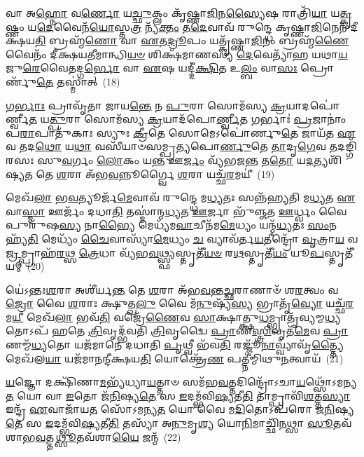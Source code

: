 𑌵𑌾 𑌅\-\ul{𑌹𑍍𑌨𑍋} 𑌵\-\ul{𑌰𑍍𑌣𑍋} 𑌯\-\ul{𑌚𑍍𑌛𑍁}\-𑌕𑍍𑌲𑌂 𑌕𑍃᳴𑌷𑍍𑌣𑌾\-\ul{𑌜𑌿}\-𑌨\-\ul{𑌸𑍍𑌯𑍈}\-𑌷 𑌰𑌾𑌤𑍍𑌰𑌿᳴\-\ul{𑌯𑌾} 𑌯\-\ul{𑌤𑍍𑌕𑍃}\-𑌷𑍍𑌣𑌂 𑌯\-\ul{𑌦𑍇}\-𑌵𑍈𑌨᳴\-\ul{𑌯𑍋}\-𑌸𑍍𑌤\-\ul{𑌤𑍍𑌰} 𑌨𑍍𑌯᳴\-\ul{𑌕𑍍𑌤𑌂} 𑌤\-\ul{𑌦𑍇}\-𑌵𑌾𑌵᳴ 𑌰𑍁𑌨𑍍𑌦𑍍𑌧𑍇 𑌕𑍃𑌷𑍍𑌣𑌾\-\ul{𑌜𑌿}\-𑌨𑍇𑌨᳴ 𑌦𑍀𑌕𑍍𑌷𑌯\-\ul{𑌤𑌿} 𑌬𑍍𑌰𑌹𑍍𑌮᳴\-\ul{𑌣𑍋} 𑌵𑌾 \ul{𑌏}\-𑌤\-\ul{𑌦𑍍𑌰𑍂}\-𑌪𑌂 𑌯𑌤𑍍𑌕𑍃᳴𑌷𑍍𑌣𑌾\-\ul{𑌜𑌿}\-𑌨𑌂 𑌬𑍍𑌰𑌹𑍍𑌮᳴\-\ul{𑌣𑍈}\-𑌵𑍈𑌨𑌂᳴ 𑌦𑍀𑌕𑍍𑌷𑌯\-\ul{𑌤𑍀}\-𑌮𑌾𑌨𑍍𑌧𑌿\-\ul{𑌯}\-\-\ul{𑍞} 𑌶𑌿𑌕𑍍𑌷᳴𑌮𑌾𑌣𑌸𑍍𑌯 \ul{𑌦𑍇}\-𑌵𑍇𑌤𑍍𑌯𑌾᳴𑌹 𑌯𑌥𑌾\-\ul{𑌯}\-𑌜𑍁\-\ul{𑌰𑍇}\-𑌵𑍈𑌤𑌦𑍍𑌗\-\ul{𑌰𑍍𑌭𑍋} 𑌵𑌾 \ul{𑌏}\-𑌷 𑌯𑌦𑍍𑌦𑍀॑\-\ul{𑌕𑍍𑌷𑌿}\-𑌤 𑌉\-\ul{𑌲𑍍𑌬𑌂} 𑌵𑌾\-\ul{𑌸𑌃} 𑌪𑍍𑌰𑍋𑌰𑍍𑌣𑍁᳴\-\ul{𑌤𑍇} 𑌤𑌸𑍍𑌮𑌾॑𑌤𑍍~(18)

𑌗\-\ul{𑌰𑍍𑌭𑌾𑌃} 𑌪𑍍𑌰𑌾𑌵𑍃᳴𑌤𑌾 𑌜𑌾𑌯\-\ul{𑌨𑍍𑌤𑍇} 𑌨 \ul{𑌪𑍁}\-𑌰𑌾 𑌸𑍋𑌮᳴𑌸𑍍𑌯 \ul{𑌕𑍍𑌰}\-𑌯𑌾𑌦𑌪𑍋॑𑌰𑍍𑌣𑍍𑌵𑍀\-\ul{𑌤} 𑌯\-\ul{𑌤𑍍𑌪𑍁}\-𑌰𑌾 𑌸𑍋𑌮᳴𑌸𑍍𑌯 \ul{𑌕𑍍𑌰}\-𑌯𑌾𑌦᳴𑌪𑍋\-\ul{𑌰𑍍𑌣𑍍𑌵𑍀}\-𑌤 𑌗𑌰𑍍𑌭𑌾𑌃॑ \ul{𑌪𑍍𑌰}\-𑌜𑌾𑌨𑌾𑌂॑ 𑌪\-\ul{𑌰𑌾}\-𑌪𑌾𑌤𑍁᳴𑌕𑌾𑌃 𑌸𑍍𑌯𑍁𑌃 \ul{𑌕𑍍𑌰𑍀}\-𑌤𑍇 𑌸𑍋𑌮𑍇\-𑌽𑌪𑍋॑𑌰𑍍𑌣𑍁\-\ul{𑌤𑍇} 𑌜𑌾𑌯᳴𑌤 \ul{𑌏}\-𑌵 𑌤𑌦\-\ul{𑌥𑍋} 𑌯\-\ul{𑌥𑌾} 𑌵𑌸𑍀᳴𑌯𑌾𑍞𑌸𑌮𑍍𑌪𑍍𑌰𑌤𑍍𑌯𑌪𑍋\-\ul{𑌰𑍍𑌣𑍁}\-𑌤𑍇 \ul{𑌤𑌾}\-𑌦𑍃\-\ul{𑌗𑍇}\-𑌵 𑌤𑌦𑌙𑍍𑌗𑌿᳴𑌰𑌸𑌃 𑌸𑍁\-\ul{𑌵}\-𑌰𑍍𑌗𑌂 \ul{𑌲𑍋}\-𑌕𑌂 𑌯\-\ul{𑌨𑍍𑌤} 𑌊\-\ul{𑌰𑍍𑌜𑌂} 𑌵𑍍𑌯᳴𑌭𑌜\-\ul{𑌨𑍍𑌤} 𑌤\-\ul{𑌤𑍋} 𑌯\-\ul{𑌦}\-𑌤𑍍𑌯𑌶𑌿᳴𑌷𑍍𑌯\-\ul{𑌤} 𑌤𑍇 \ul{𑌶}\-𑌰𑌾 𑌅᳴𑌭\-\ul{𑌵}\-𑌨𑍍𑌨𑍂𑌰𑍍𑌗𑍍𑌵𑍈 \ul{𑌶}\-𑌰𑌾 𑌯𑌚𑍍𑌛᳴\-\ul{𑌰}\-𑌮𑌯𑍀॑~(19)

𑌮𑍇𑌖᳴\-\ul{𑌲𑌾} 𑌭\-\ul{𑌵}\-𑌤𑍍𑌯𑍂𑌰𑍍𑌜᳴\-\ul{𑌮𑍇}\-𑌵𑌾𑌵᳴ 𑌰𑍁𑌨𑍍𑌦𑍍𑌧𑍇 𑌮\-\ul{𑌧𑍍𑌯}\-𑌤𑌃 𑌸𑌨𑍍𑌨᳴𑌹𑍍𑌯𑌤𑌿 𑌮\-\ul{𑌧𑍍𑌯}\-𑌤 \ul{𑌏}\-𑌵𑌾\-\ul{𑌸𑍍𑌮𑌾} 𑌊𑌰𑍍𑌜𑌂᳴ 𑌦𑌧𑌾\-\ul{𑌤𑌿} 𑌤𑌸𑍍𑌮𑌾॑𑌨𑍍𑌮\-\ul{𑌧𑍍𑌯}\-𑌤 \ul{𑌊}\-𑌰𑍍𑌜𑌾 𑌭𑍁᳴𑌞𑍍𑌜𑌤 \ul{𑌊}\-𑌰𑍍𑌧𑍍𑌵𑌂 𑌵𑍈 𑌪𑍁𑌰𑍁᳴𑌷\-\ul{𑌸𑍍𑌯} 𑌨𑌾\-\ul{𑌭𑍍𑌯𑍈} 𑌮𑍇𑌧𑍍𑌯᳴𑌮\-\ul{𑌵𑌾}\-𑌚𑍀𑌨᳴𑌮\-\ul{𑌮𑍇}\-𑌧𑍍𑌯𑌂 𑌯𑌨𑍍𑌮᳴\-\ul{𑌧𑍍𑌯}\-𑌤𑌃 \ul{𑌸𑌂}\-𑌨𑌹𑍍𑌯᳴\-\ul{𑌤𑌿} 𑌮𑍇𑌧𑍍𑌯𑌂᳴ \ul{𑌚𑍈}\-𑌵𑌾𑌸𑍍𑌯𑌾᳴\-\ul{𑌮𑍇}\-𑌧𑍍𑌯𑌂 \ul{𑌚} 𑌵𑍍𑌯𑌾𑌵᳴𑌰𑍍𑌤\-\ul{𑌯}\-𑌤𑍀𑌨𑍍𑌦𑍍𑌰𑍋᳴ \ul{𑌵𑍃}\-𑌤𑍍𑌰𑌾\-\ul{𑌯} 𑌵\-\ul{𑌜𑍍𑌰}\-𑌮𑍍𑌪𑍍𑌰𑌾𑌹᳴\-\ul{𑌰}\-𑌥𑍍𑌸 \ul{𑌤𑍍𑌰𑍇}\-𑌧𑌾 𑌵𑍍𑌯᳴𑌭\-\ul{𑌵}\-𑌥𑍍𑌸𑍍𑌫𑍍𑌯𑌸𑍍𑌤𑍃𑌤𑍀᳴\-\ul{𑌯}\-\-\ul{𑍞} 𑌰\-\ul{𑌥}\-𑌸𑍍𑌤𑍃𑌤𑍀᳴\-\ul{𑌯𑌂} 𑌯𑍂\-\ul{𑌪}\-𑌸𑍍𑌤𑍃𑌤𑍀᳴𑌯𑌮𑍍~(20)

𑌯𑍇॑\-𑌽𑌨𑍍𑌤𑌃\-\ul{𑌶}\-𑌰𑌾 𑌅𑌶𑍀॑𑌰𑍍𑌯\-\ul{𑌨𑍍𑌤} 𑌤𑍇 \ul{𑌶}\-𑌰𑌾 𑌅᳴𑌭\-\ul{𑌵}\-𑌨𑍍𑌤\-\ul{𑌚𑍍𑌛}\-𑌰𑌾𑌣𑌾𑍞᳴ 𑌶\-\ul{𑌰}\-𑌤𑍍𑌵𑌂 𑌵\-\ul{𑌜𑍍𑌰𑍋} 𑌵𑍈 \ul{𑌶}\-𑌰𑌾𑌃 𑌕𑍍𑌷𑍁𑌤𑍍𑌖\-\ul{𑌲𑍁} 𑌵𑍈 𑌮᳴\-\ul{𑌨𑍁}\-𑌷𑍍𑌯᳴\-\ul{𑌸𑍍𑌯} 𑌭𑍍𑌰𑌾𑌤𑍃᳴\-\ul{𑌵𑍍𑌯𑍋} 𑌯𑌚𑍍𑌛᳴\-\ul{𑌰}\-𑌮\-\ul{𑌯𑍀} 𑌮𑍇𑌖᳴\-\ul{𑌲𑌾} 𑌭𑌵᳴\-\ul{𑌤𑌿} 𑌵𑌜𑍍𑌰𑍇᳴\-\ul{𑌣𑍈}\-𑌵 \ul{𑌸𑌾}\-𑌕𑍍𑌷𑌾𑌤𑍍𑌕𑍍𑌷𑍁\-\ul{𑌧}\-𑌮𑍍𑌭𑍍𑌰𑌾𑌤𑍃᳴𑌵𑍍𑌯𑌮𑍍𑌮\-\ul{𑌧𑍍𑌯}\-𑌤𑍋\-𑌽𑌪᳴ 𑌹𑌤𑍇 \ul{𑌤𑍍𑌰𑌿}\-𑌵𑍃𑌦𑍍𑌭᳴𑌵𑌤𑌿 \ul{𑌤𑍍𑌰𑌿}\-𑌵𑍃𑌦𑍍𑌵𑍈 \ul{𑌪𑍍𑌰𑌾}\-𑌣\-\ul{𑌸𑍍𑌤𑍍𑌰𑌿}\-𑌵𑍃𑌤᳴\-\ul{𑌮𑍇}\-𑌵 \ul{𑌪𑍍𑌰𑌾}\-𑌣𑌮𑍍𑌮᳴\-\ul{𑌧𑍍𑌯}\-𑌤𑍋 𑌯𑌜᳴𑌮𑌾𑌨𑍇 𑌦𑌧𑌾𑌤𑌿 \ul{𑌪𑍃}\-𑌥𑍍𑌵𑍀 𑌭᳴𑌵\-\ul{𑌤𑌿} 𑌰𑌜𑍍𑌜𑍂᳴\-\ul{𑌨𑌾}\-𑌵𑍍𑌵𑍍𑌯𑌾𑌁𑌵𑍃᳴\-\ul{𑌤𑍍𑌤𑍍𑌯𑍈} 𑌮𑍇𑌖᳴𑌲\-\ul{𑌯𑌾} 𑌯𑌜᳴𑌮𑌾𑌨𑌨𑍍𑌦𑍀𑌕𑍍𑌷𑌯\-\ul{𑌤𑌿} 𑌯𑍋𑌕𑍍𑌤𑍍𑌰𑍇᳴\-\ul{𑌣} 𑌪𑌤𑍍𑌨𑍀॑𑌮𑍍𑌮𑌿𑌥𑍁\-\ul{𑌨}\-𑌤𑍍𑌵𑌾𑌯᳴~(21)

\-\ul{𑌯}\-𑌜𑍍𑌞𑍋 𑌦𑌕𑍍𑌷𑌿᳴𑌣𑌾\-\ul{𑌮}\-𑌭𑍍𑌯᳴𑌧𑍍𑌯𑌾\-\ul{𑌯}\-𑌤𑍍𑌤𑌾𑍞 𑌸𑌮᳴𑌭\-\ul{𑌵}\-𑌤𑍍𑌤𑌦𑌿𑌨𑍍𑌦𑍍𑌰𑍋᳴\-𑌽𑌚𑌾\-\ul{𑌯}\-𑌥𑍍𑌸𑍋᳴\-𑌽𑌮𑌨𑍍𑌯\-\ul{𑌤} 𑌯𑍋 𑌵𑌾 \ul{𑌇}\-𑌤𑍋 𑌜᳴\-\ul{𑌨𑌿}\-𑌷𑍍𑌯\-\ul{𑌤𑍇} 𑌸 \ul{𑌇}\-𑌦𑌮𑍍𑌭᳴𑌵𑌿\-\ul{𑌷𑍍𑌯}\-𑌤𑍀\-\ul{𑌤𑌿} 𑌤𑌾𑌮𑍍𑌪𑍍𑌰𑌾𑌵𑌿᳴\-\ul{𑌶}\-𑌤𑍍𑌤\-\ul{𑌸𑍍𑌯𑌾} 𑌇𑌨𑍍𑌦𑍍𑌰᳴ \ul{𑌏}\-𑌵𑌾𑌜𑌾᳴𑌯\-\ul{𑌤} 𑌸𑍋᳴\-𑌽𑌮𑌨𑍍𑌯\-\ul{𑌤} 𑌯𑍋 𑌵𑍈 𑌮\-\ul{𑌦𑌿}\-𑌤𑍋\-𑌽𑌪᳴𑌰𑍋 𑌜\-\ul{𑌨𑌿}\-𑌷𑍍𑌯\-\ul{𑌤𑍇} 𑌸 \ul{𑌇}\-𑌦𑌮𑍍𑌭᳴𑌵𑌿\-\ul{𑌷𑍍𑌯}\-𑌤𑍀\-\ul{𑌤𑌿} 𑌤𑌸𑍍𑌯𑌾᳴ 𑌅\-\ul{𑌨𑍁}\-𑌮𑍃\-\ul{𑌶𑍍𑌯} 𑌯𑍋\-\ul{𑌨𑌿}\-𑌮𑌾𑌚𑍍𑌛𑌿᳴\-\ul{𑌨}\-𑌥𑍍𑌸𑌾 \ul{𑌸𑍂}\-𑌤𑌵᳴𑌶𑌾𑌭\-\ul{𑌵}\-𑌤𑍍𑌤\-\ul{𑌥𑍍𑌸𑍂}\-𑌤𑌵᳴𑌶𑌾\-\ul{𑌯𑍈} 𑌜𑌨𑍍𑌮᳴~(22)

